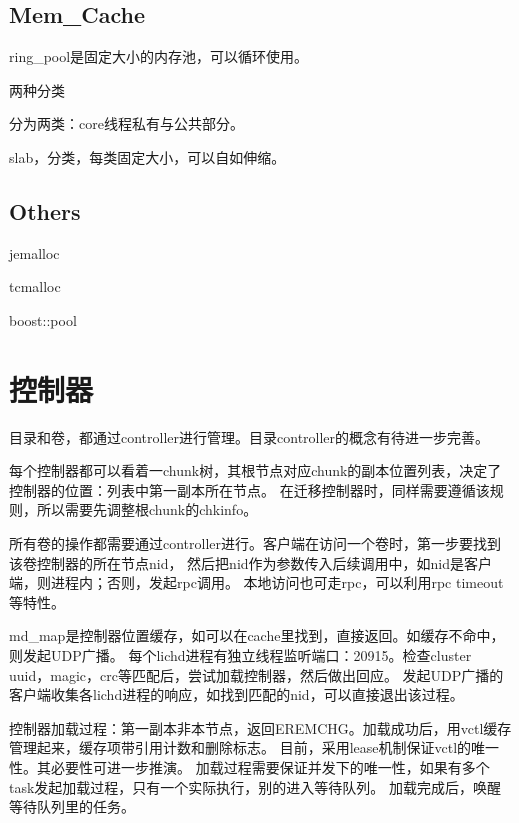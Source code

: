 \subsection{Mem\_Cache}

ring\_pool是固定大小的内存池，可以循环使用。

两种分类
\begin{enumbox}
\item 分为两类：core线程私有与公共部分。
\item slab，分类，每类固定大小，可以自如伸缩。
\end{enumbox}

\subsection{Others}

\begin{enumbox}
\item jemalloc
\item tcmalloc
\item boost::pool
\end{enumbox}

\section{控制器}

目录和卷，都通过controller进行管理。目录controller的概念有待进一步完善。

每个控制器都可以看着一chunk树，其根节点对应chunk的副本位置列表，决定了控制器的位置：列表中第一副本所在节点。
在迁移控制器时，同样需要遵循该规则，所以需要先调整根chunk的chkinfo。

所有卷的操作都需要通过controller进行。客户端在访问一个卷时，第一步要找到该卷控制器的所在节点nid，
然后把nid作为参数传入后续调用中，如nid是客户端，则进程内；否则，发起rpc调用。
本地访问也可走rpc，可以利用rpc timeout等特性。

md\_map是控制器位置缓存，如可以在cache里找到，直接返回。如缓存不命中，则发起UDP广播。
每个lichd进程有独立线程监听端口：20915。检查cluster uuid，magic，crc等匹配后，尝试加载控制器，然后做出回应。
发起UDP广播的客户端收集各lichd进程的响应，如找到匹配的nid，可以直接退出该过程。

控制器加载过程：第一副本非本节点，返回EREMCHG。加载成功后，用vctl缓存管理起来，缓存项带引用计数和删除标志。
目前，采用lease机制保证vctl的唯一性。其必要性可进一步推演。
加载过程需要保证并发下的唯一性，如果有多个task发起加载过程，只有一个实际执行，别的进入等待队列。
加载完成后，唤醒等待队列里的任务。

